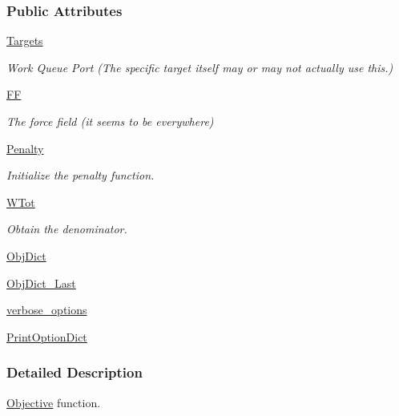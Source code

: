 \subsubsection*{Public Attributes}
\begin{DoxyCompactItemize}
\item 
\hyperlink{classforcebalance_1_1objective_1_1Objective_a20e0d09fb2b889b5f604e75a020601a8}{Targets}
\begin{DoxyCompactList}\small\item\em Work Queue Port (The specific target itself may or may not actually use this.) \end{DoxyCompactList}\item 
\hyperlink{classforcebalance_1_1objective_1_1Objective_a99df04c43a075adc23eb8a5cf6b60ce3}{F\-F}
\begin{DoxyCompactList}\small\item\em The force field (it seems to be everywhere) \end{DoxyCompactList}\item 
\hyperlink{classforcebalance_1_1objective_1_1Objective_aafb2228e87f0e3647b2e4be0678d76ba}{Penalty}
\begin{DoxyCompactList}\small\item\em Initialize the penalty function. \end{DoxyCompactList}\item 
\hyperlink{classforcebalance_1_1objective_1_1Objective_a1ea300bb1db142dfdf43621454e8c589}{W\-Tot}
\begin{DoxyCompactList}\small\item\em Obtain the denominator. \end{DoxyCompactList}\item 
\hyperlink{classforcebalance_1_1objective_1_1Objective_aee0b6ceda10120047e9ebe6f20c1f8a0}{Obj\-Dict}
\item 
\hyperlink{classforcebalance_1_1objective_1_1Objective_a86263748baa5017d4dc1c3a824d7382e}{Obj\-Dict\-\_\-\-Last}
\item 
\hyperlink{classforcebalance_1_1BaseClass_afd68efa29ccd2f320f4cf82198214aac}{verbose\-\_\-options}
\item 
\hyperlink{classforcebalance_1_1BaseClass_afc6659278497d7245bc492ecf405ccae}{Print\-Option\-Dict}
\end{DoxyCompactItemize}


\subsubsection{Detailed Description}
\hyperlink{classforcebalance_1_1objective_1_1Objective}{Objective} function. 


